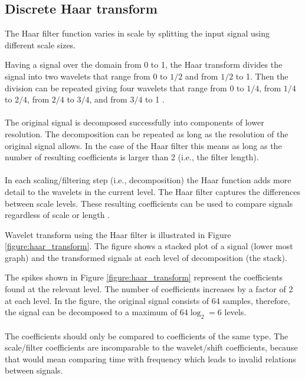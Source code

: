 \subsection{Discrete Haar transform}
The Haar filter function varies in scale by splitting the input signal using
different scale sizes.

Having a signal over the domain from 0 to 1, the Haar transform divides the
signal into two wavelets that range from 0 to $1/2$ and from $1/2$ to 1. Then
the division can be repeated giving four wavelets that range from 0 to $1/4$,
from $1/4$ to $2/4$, from $2/4$ to $3/4$, and from $3/4$ to 1 \cite{graps}.

\paragraph{}
The original signal is decomposed successfully into components of lower
resolution. The decomposition can be repeated as long as the resolution of
the original signal allows. In the case of the Haar filter this means as long
as the number of resulting coefficients is larger than 2 (i.e., the filter
length).

\paragraph{}
In each scaling/filtering step (i.e., decomposition) the Haar function adds
more detail to the wavelets in the current level. The Haar filter captures the
differences between scale levels. These resulting coefficients can be used to
compare signals regardless of scale or length \cite{graps}.

Wavelet transform using the Haar filter is illustrated in Figure
\ref{figure:haar_transform}. The figure shows a stacked plot of a signal
(lower most graph) and the transformed signals at each level of decomposition
(the stack).



The spikes shown in Figure \ref{figure:haar_transform} represent the
coefficients found at the relevant level. The number of coefficients increases
by a factor of 2 at each level. In the figure, the original signal consists of
64 samples, therefore, the signal can be decomposed to a maximum of $64 \log_{2}
= 6$ levels.

\paragraph{}
The coefficients should only be compared to coefficients of the same type. The
scale/filter coefficients are incomparable to the wavelet/shift coefficients,
because that would mean comparing time with frequency which leads to invalid
relations between signals.


